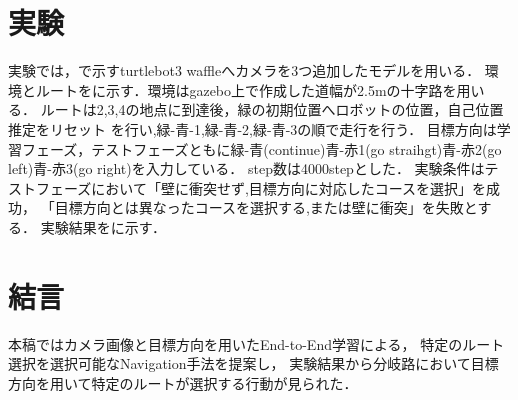 \documentclass[10pt]{jarticle}
\begin{document}
    \section{実\hspace{2zw}験}%
    実験では，で示すturtlebot3 waffleへカメラを3つ追加したモデルを用いる．
    環境とルートをに示す．環境はgazebo上で作成した道幅が2.5mの十字路を用いる．
    ルートは2,3,4の地点に到達後，緑の初期位置へロボットの位置，自己位置推定をリセット
    を行い,緑-青-1,緑-青-2,緑-青-3の順で走行を行う．
    目標方向は学習フェーズ，テストフェーズともに緑-青(continue)青-赤1(go straihgt)青-赤2(go left)青-赤3(go right)を入力している．
    step数は4000stepとした．
    実験条件はテストフェーズにおいて「壁に衝突せず,目標方向に対応したコースを選択」を成功，
     「目標方向とは異なったコースを選択する,または壁に衝突」を失敗とする．
    実験結果をに示す．
       
    
            
    \section{結\hspace{2zw}言}%
    本稿ではカメラ画像と目標方向を用いたEnd-to-End学習による，
    特定のルート選択を選択可能なNavigation手法を提案し，
    実験結果から分岐路において目標方向を用いて特定のルートが選択する行動が見られた．
    
\end{document}
